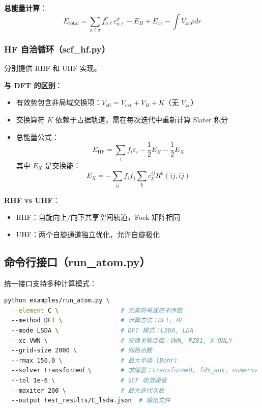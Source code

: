 \documentclass[12pt,a4paper]{article}
\begin{document}
\textbf{总能量计算}：
\begin{equation}
    E_{\text{total}} = \sum_{n\ell\sigma} f_{n\ell}^\sigma \varepsilon_{n\ell}^\sigma - E_H + E_{xc} - \int V_{xc} \rho dr
\end{equation}

\subsubsection{HF 自洽循环（scf\_hf.py）}

分别提供 RHF 和 UHF 实现。

\textbf{与 DFT 的区别}：
\begin{itemize}
    \item 有效势包含非局域交换项：$V_{\text{eff}} = V_{\text{ext}} + V_H + K$（无 $V_{xc}$）
    \item 交换算符 $K$ 依赖于占据轨道，需在每次迭代中重新计算 Slater 积分
    \item 总能量公式：
          \begin{equation}
              E_{\text{HF}} = \sum_i f_i \varepsilon_i - \frac{1}{2} E_H - \frac{1}{2} E_X
          \end{equation}
          其中 $E_X$ 是交换能：
          \begin{equation}
              E_X = -\sum_{ij} f_i f_j \sum_k c_k^{ij} R^k(ij,ij)
          \end{equation}
\end{itemize}

\textbf{RHF vs UHF}：
\begin{itemize}
    \item RHF：自旋向上/向下共享空间轨道，Fock 矩阵相同
    \item UHF：两个自旋通道独立优化，允许自旋极化
\end{itemize}

\subsection{命令行接口（run\_atom.py）}

统一接口支持多种计算模式：

\begin{lstlisting}[language=bash, frame=single]
python examples/run_atom.py \
  --element C \                 # 元素符号或原子序数
  --method DFT \                # 计算方法：DFT, HF
  --mode LSDA \                 # DFT 模式：LSDA, LDA
  --xc VWN \                    # 交换关联泛函：VWN, PZ81, X_ONLY
  --grid-size 2000 \            # 网格点数
  --rmax 150.0 \                # 最大半径 (Bohr)
  --solver transformed \        # 求解器：transformed, fd5_aux, numerov
  --tol 1e-6 \                  # SCF 收敛阈值
  --maxiter 200 \               # 最大迭代次数
  --output test_results/C_lsda.json  # 输出文件
\end{lstlisting}
\end{document}
